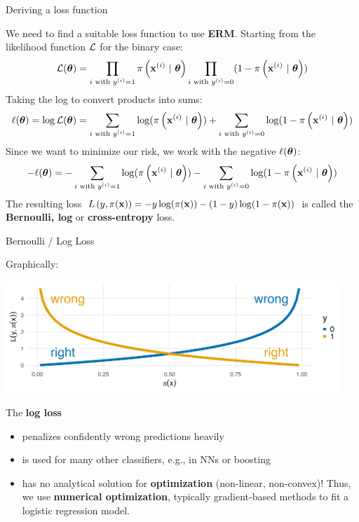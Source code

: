 \documentclass[11pt,compress,t,notes=noshow, xcolor=table]{beamer}
\begin{document}
\begin{vbframe}{Deriving a loss function}

We need to find a suitable loss function to use \textbf{ERM}. Starting from the likelihood function $\mathcal{L}$ for the binary case:
$$
\mathcal{L}(\bm{\theta}) = \prod_{i \text{ with } y^{(i)} = 1} \pi\left(\mathbf{x}^{(i)} ~|~ \bm{\theta}\right) \prod_{i \text{ with } y^{(i)} = 0} (1-\pi\left(\mathbf{x}^{(i)} ~|~ \bm{\theta}\right))
$$
Taking the log to convert products into sums:
$$
\ell(\bm{\theta}) = \log \mathcal{L}(\bm{\theta}) = \sum_{i \text{ with } y^{(i)} = 1} \log(\pi\left(\mathbf{x}^{(i)} ~|~ \bm{\theta}\right)) + \sum_{i \text{ with } y^{(i)} = 0} \log(1-\pi\left(\mathbf{x}^{(i)} ~|~ \bm{\theta}\right))
$$
Since we want to minimize our risk, we work with the negative $\ell(\bm{\theta})$:
$$
- \ell(\bm{\theta}) = - \sum_{i \text{ with } y^{(i)} = 1} \log(\pi\left(\mathbf{x}^{(i)} ~|~ \bm{\theta}\right)) - \sum_{i \text{ with } y^{(i)} = 0} \log(1-\pi\left(\mathbf{x}^{(i)} ~|~ \bm{\theta}\right))
$$
The resulting loss $L\left(y, \pi(\mathbf{x})\right) = -y\log(\pi(\mathbf{x}))-(1-y)\log(1-\pi(\mathbf{x}))$ is called the \textbf{Bernoulli, log} or \textbf{cross-entropy} loss.
\end{vbframe}

\begin{vbframe}{Bernoulli / Log Loss}

Graphically:

{\centering \includegraphics[width=0.95\textwidth]{figure/log_loss.png}

}

The \textbf{log loss}
\begin{itemize}
  \item penalizes confidently wrong predictions heavily
  \item is used for many other classifiers, e.g., in NNs or boosting 
  \item has no analytical solution for \textbf{optimization} (non-linear, non-convex)! Thus, we use \textbf{numerical optimization}, typically gradient-based methods to fit a logistic regression model.
\end{itemize}


\end{vbframe}
\end{document}
